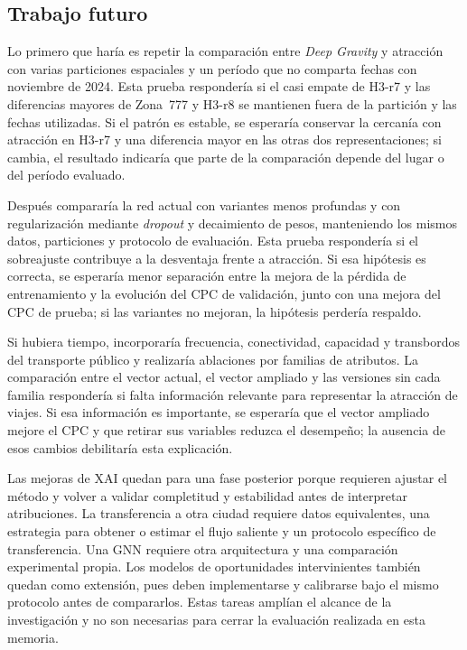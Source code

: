 \subsection{Trabajo futuro}

Lo primero que haría es repetir la comparación entre \textit{Deep Gravity} y atracción con varias particiones espaciales y un período que no comparta fechas con noviembre de 2024. Esta prueba respondería si el casi empate de H3-r7 y las diferencias mayores de Zona~777 y H3-r8 se mantienen fuera de la partición y las fechas utilizadas. Si el patrón es estable, se esperaría conservar la cercanía con atracción en H3-r7 y una diferencia mayor en las otras dos representaciones; si cambia, el resultado indicaría que parte de la comparación depende del lugar o del período evaluado.

Después compararía la red actual con variantes menos profundas y con regularización mediante \textit{dropout} y decaimiento de pesos, manteniendo los mismos datos, particiones y protocolo de evaluación. Esta prueba respondería si el sobreajuste contribuye a la desventaja frente a atracción. Si esa hipótesis es correcta, se esperaría menor separación entre la mejora de la pérdida de entrenamiento y la evolución del CPC de validación, junto con una mejora del CPC de prueba; si las variantes no mejoran, la hipótesis perdería respaldo.

Si hubiera tiempo, incorporaría frecuencia, conectividad, capacidad y transbordos del transporte público y realizaría ablaciones por familias de atributos. La comparación entre el vector actual, el vector ampliado y las versiones sin cada familia respondería si falta información relevante para representar la atracción de viajes. Si esa información es importante, se esperaría que el vector ampliado mejore el CPC y que retirar sus variables reduzca el desempeño; la ausencia de esos cambios debilitaría esta explicación.

Las mejoras de XAI quedan para una fase posterior porque requieren ajustar el método y volver a validar completitud y estabilidad antes de interpretar atribuciones. La transferencia a otra ciudad requiere datos equivalentes, una estrategia para obtener o estimar el flujo saliente y un protocolo específico de transferencia. Una GNN requiere otra arquitectura y una comparación experimental propia. Los modelos de oportunidades intervinientes también quedan como extensión, pues deben implementarse y calibrarse bajo el mismo protocolo antes de compararlos. Estas tareas amplían el alcance de la investigación y no son necesarias para cerrar la evaluación realizada en esta memoria.


